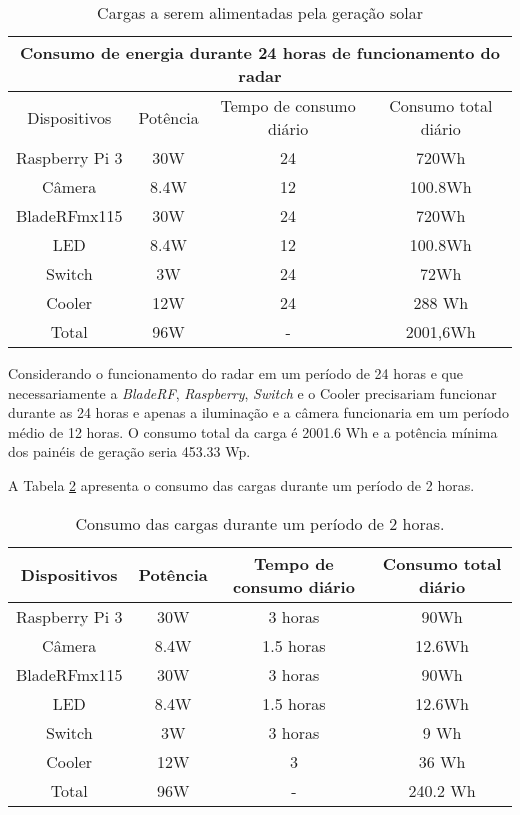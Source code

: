 \begin{table}[H]
\caption{Cargas a serem alimentadas pela geração solar}\label{tab24}
\begin{tabular}{|c|c|c|c|}
\hline
\multicolumn{4}{|c|}{Consumo de energia durante 24 horas de funcionamento do radar}                                                 \\ \hline
Dispositivos & Potência & Tempo de consumo diário & Consumo total diário \\ \hline
Raspberry Pi 3  & 30W  & 24  & 720Wh  \\ \hline
Câmera & 8.4W  & 12 & 100.8Wh \\ \hline
BladeRFmx115 & 30W  & 24 & 720Wh \\ \hline
LED       & 8.4W &  12 & 100.8Wh  \\ \hline
Switch       & 3W &  24 & 72Wh \\ \hline
Cooler  &  12W & 24  & 288 Wh \\ \hline
Total & 96W & - & 2001,6Wh \\ \hline

\end{tabular}
\end{table}
\FloatBarrier

Considerando o funcionamento do radar em um período de 24 horas e que necessariamente a \textit{BladeRF}, \textit{Raspberry}, \textit{Switch} e o Cooler precisariam funcionar durante as 24 horas e apenas a iluminação e a câmera funcionaria em um período médio de 12 horas. O consumo total da carga é 2001.6 Wh e a potência mínima dos painéis de geração seria 453.33 Wp.

A Tabela \ref{tab6} apresenta o consumo das cargas durante um período de 2 horas.

\begin{table}[H]

\caption{\label{tab6}Consumo das cargas durante um período de 2 horas.}
\begin{tabular}{|c|c|c|c|} 

\hline
Dispositivos             & Potência         & Tempo de consumo diário & Consumo total diário \\ \hline
Raspberry Pi 3  & 30W  & 3 horas          & 90Wh    \\ \hline
Câmera & 8.4W  &   1.5 horas        & 12.6Wh \\ \hline
BladeRFmx115 & 30W  & 3 horas         & 90Wh \\ \hline
LED       & 8.4W &  1.5 horas & 12.6Wh    \\ \hline
Switch       & 3W &  3 horas & 9 Wh    \\ \hline
Cooler  &  12W & 3  & 36 Wh \\ \hline
Total & 96W & - & 240.2 Wh \\ \hline

\end{tabular}
\end{table}
\FloatBarrier

